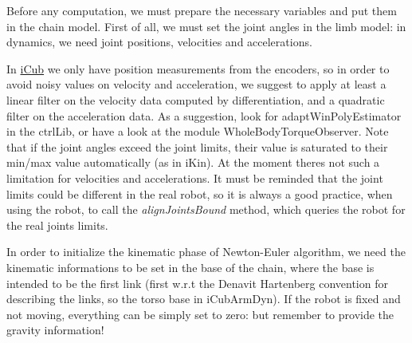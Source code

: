 Before any computation, we must prepare the necessary variables and put them in the chain model. First of all, we must set the joint angles in the limb model\+: in dynamics, we need joint positions, velocities and accelerations.


\begin{DoxyCode}{0}

\end{DoxyCode}


In \mbox{\hyperlink{namespaceiCub}{i\+Cub}} we only have position measurements from the encoders, so in order to avoid noisy values on velocity and acceleration, we suggest to apply at least a linear filter on the velocity data computed by differentiation, and a quadratic filter on the acceleration data. As a suggestion, look for adapt\+Win\+Poly\+Estimator in the ctrl\+Lib, or have a look at the module Whole\+Body\+Torque\+Observer. Note that if the joint angles exceed the joint limits, their value is saturated to their min/max value automatically (as in i\+Kin). At the moment there\textquotesingle{}s not such a limitation for velocities and accelerations. It must be reminded that the joint limits could be different in the real robot, so it is always a good practice, when using the robot, to call the {\itshape align\+Joints\+Bound} method, which queries the robot for the real joints limits.


\begin{DoxyCode}{0}

\end{DoxyCode}


In order to initialize the kinematic phase of Newton-\/\+Euler algorithm, we need the kinematic informations to be set in the base of the chain, where the base is intended to be the first link (first w.\+r.\+t the Denavit Hartenberg convention for describing the links, so the torso base in i\+Cub\+Arm\+Dyn). If the robot is fixed and not moving, everything can be simply set to zero\+: but remember to provide the gravity information!


\begin{DoxyCode}{0}

\end{DoxyCode}


